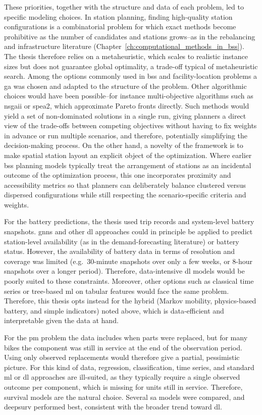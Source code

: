These priorities, together with the structure and data of each problem, led to specific modeling choices. In station planning, finding high-quality station configurations is a combinatorial problem for which exact methods become prohibitive as the number of candidates and stations grows--as in the rebalancing and infrastructure literature (Chapter~\ref{ch:computational_methods_in_bss}). The thesis therefore relies on a metaheuristic, which scales to realistic instance sizes but does not guarantee global optimality, a trade-off typical of metaheuristic search. Among the options commonly used in \ac{bss} and facility-location problems a \ac{ga} was chosen and adapted to the structure of the problem. Other algorithmic choices would have been possible--for instance multi-objective algorithms such as \ac{nsgaii} or \ac{spea2}, which approximate Pareto fronts directly. Such methods would yield a set of non-dominated solutions in a single run, giving planners a direct view of the trade-offs between competing objectives without having to fix weights in advance or run multiple scenarios, and therefore, potentially simplifying the decision-making process. On the other hand, a novelty of the framework is to make spatial station layout an explicit object of the optimization. Where earlier \ac{bss} planning models typically treat the arrangement of stations as an incidental outcome of the optimization process, this one incorporates proximity and accessibility metrics so that planners can deliberately balance clustered versus dispersed configurations while still respecting the scenario-specific criteria and weights.

For the battery predictions, the thesis used trip records and system-level battery snapshots. \acp{gnn} and other \ac{dl} approaches could in principle be applied to predict station-level availability (as in the demand-forecasting literature) or battery status. However, the availability of battery data in terms of resolution and coverage was limited (e.g.\ 30-minute snapshots over only a few weeks, or 8-hour snapshots over a longer period). Therefore, data-intensive \ac{dl} models would be poorly suited to these constraints. Moreover, other options such as classical time series or tree-based \ac{ml} on tabular features would face the same problem. Therefore, this thesis opts instead for the hybrid (Markov mobility, physics-based battery, and simple indicators) noted above, which is data-efficient and interpretable given the data at hand. 

For the \ac{pm} problem the data includes when parts were replaced, but for many bikes the component was still in service at the end of the observation period. Using only observed replacements would therefore give a partial, pessimistic picture. For this kind of data, regression, classification, time series, and standard \ac{ml} or \ac{dl} approaches are ill-suited, as they typically require a single observed outcome per component, which is missing for units still in service. Therefore, survival models are the natural choice. Several \ac{sa} models were compared, and \ac{deepsurv} performed best, consistent with the broader trend toward \ac{dl}.

